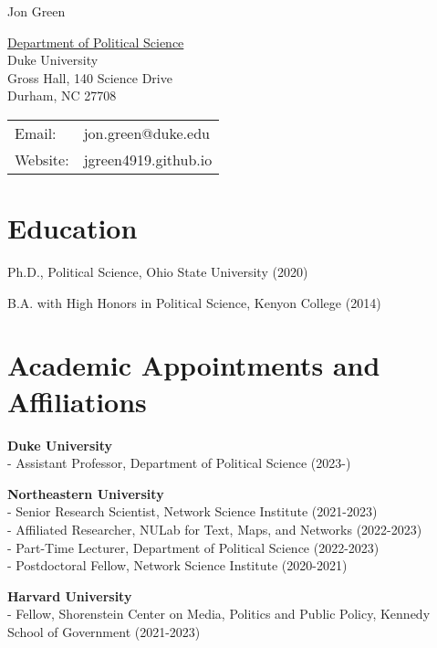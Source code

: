 \documentclass[letterpaper]{article}
\def\name{Jon Green}
\renewenvironment{itemize}{
  \begin{list}{}{
    \setlength{\leftmargin}{1.5em}
  }
}{
  \end{list}
}
\begin{document}
{\huge \name}


\vspace{0.25in}

\begin{minipage}{0.45\linewidth}
  \href{https://polisci.duke.edu//}{Department of Political Science} \\
    Duke University \\
    Gross Hall, 140 Science Drive\\
  Durham, NC 27708
\end{minipage}
\begin{minipage}{0.45\linewidth}
  \begin{tabular}{ll}
    Email: & jon.green@duke.edu \\
    Website: & jgreen4919.github.io \\
  \end{tabular}
\end{minipage}

\section*{Education}

\begin{itemize}
    \item Ph.D., Political Science, Ohio State University (2020)
	\item B.A. with High Honors in Political Science, Kenyon College (2014)
\end{itemize}

\section*{Academic Appointments and Affiliations}
\begin{itemize}

\item \textbf{Duke University} \\
- Assistant Professor, Department of Political Science (2023-)

\item \textbf{Northeastern University} \\
- Senior Research Scientist, Network Science Institute (2021-2023)\\
- Affiliated Researcher, NULab for Text, Maps, and Networks (2022-2023) \\
- Part-Time Lecturer, Department of Political Science (2022-2023)\\
- Postdoctoral Fellow, Network Science Institute  (2020-2021)

\item \textbf{Harvard University} \\
- Fellow, Shorenstein Center on Media, Politics and Public Policy, Kennedy School of Government (2021-2023)

\end{itemize}
\end{document}
